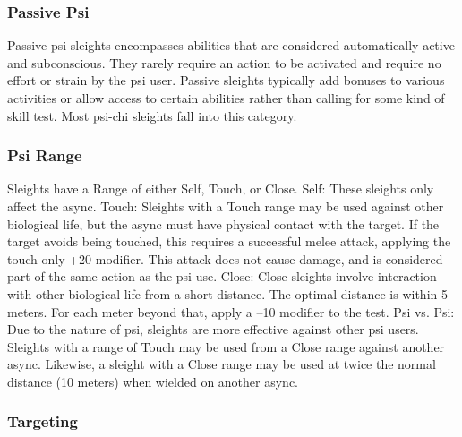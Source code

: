 \subsubsection{Passive Psi}

Passive psi sleights encompasses abilities that are considered
automatically active and subconscious. They
rarely require an action to be activated and require
no effort or strain by the psi user. Passive sleights typically
add bonuses to various activities or allow access
to certain abilities rather than calling for some kind of
skill test. Most psi-chi sleights fall into this category.

\subsubsection{Psi Range}

Sleights have a Range of either Self, Touch, or Close.
Self: These sleights only affect the async.
Touch: Sleights with a Touch range may be used
against other biological life, but the async must have
physical contact with the target. If the target avoids
being touched, this requires a successful melee attack,
applying the touch-only +20 modifier. This attack
does not cause damage, and is considered part of the
same action as the psi use.
Close: Close sleights involve interaction with other
biological life from a short distance. The optimal distance
is within 5 meters. For each meter beyond that,
apply a –10 modifier to the test.
Psi vs. Psi: Due to the nature of psi, sleights are
more effective against other psi users. Sleights with
a range of Touch may be used from a Close range
against another async. Likewise, a sleight with a Close
range may be used at twice the normal distance (10
meters) when wielded on another async.

\subsubsection{Targeting}

